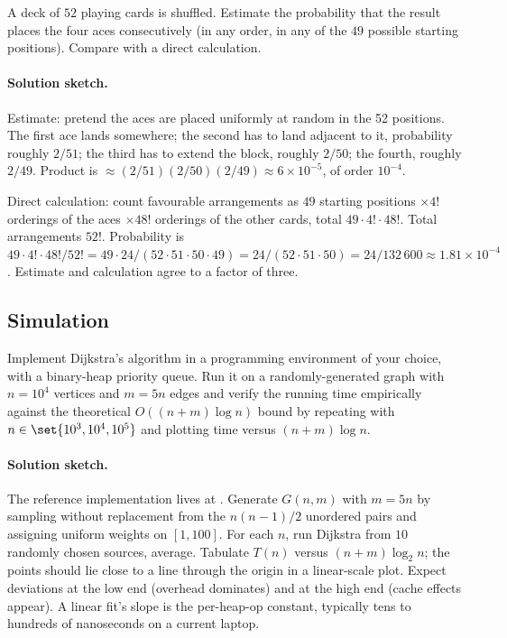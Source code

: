 \begin{exercise}
A deck of $52$ playing cards is shuffled. Estimate the probability
that the result places the four aces consecutively (in any order,
in any of the $49$ possible starting positions). Compare with a
direct calculation.
\end{exercise}

\paragraph{Solution sketch.}
Estimate: pretend the aces are placed uniformly at random in the
52 positions. The first ace lands somewhere; the second has to
land adjacent to it, probability roughly $2/51$; the third has to
extend the block, roughly $2/50$; the fourth, roughly $2/49$.
Product is $\approx (2/51)(2/50)(2/49) \approx 6 \times 10^{-5}$,
of order $10^{-4}$.

Direct calculation: count favourable arrangements as
$49$ starting positions $\times 4!$ orderings of the aces $\times
48!$ orderings of the other cards, total $49 \cdot 4! \cdot 48!$.
Total arrangements $52!$. Probability is $49 \cdot 4! \cdot 48! /
52! = 49 \cdot 24 / (52 \cdot 51 \cdot 50 \cdot 49) = 24 / (52
\cdot 51 \cdot 50) = 24 / 132\,600 \approx 1.81 \times 10^{-4}$.
Estimate and calculation agree to a factor of three.

\subsection*{Simulation}

\begin{exercise}
Implement Dijkstra's algorithm in a programming environment of
your choice, with a binary-heap priority queue. Run it on a
randomly-generated graph with $n = 10^{4}$ vertices and $m = 5 n$
edges and verify the running time empirically against the
theoretical $O((n + m) \log n)$ bound by repeating with $n \in
\set{10^{3}, 10^{4}, 10^{5}}$ and plotting time versus
$(n + m) \log n$.
\end{exercise}

\paragraph{Solution sketch.}
The reference implementation lives at
.
Generate $G(n, m)$ with $m = 5n$ by sampling without replacement
from the $n(n-1)/2$ unordered pairs and assigning uniform weights
on $[1, 100]$. For each $n$, run Dijkstra from $10$ randomly
chosen sources, average. Tabulate $T(n)$ versus $(n + m) \log_{2}
n$; the points should lie close to a line through the origin in a
linear-scale plot. Expect deviations at the low end (overhead
dominates) and at the high end (cache effects appear). A linear
fit's slope is the per-heap-op constant, typically tens to
hundreds of nanoseconds on a current laptop.


